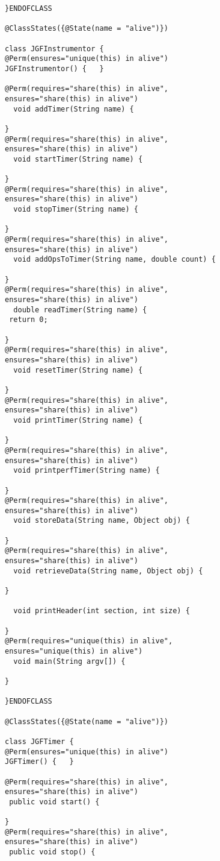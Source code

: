 \documentclass[10pt]{article}
\begin{document}
\begin{lstlisting}
}ENDOFCLASS

@ClassStates({@State(name = "alive")})

class JGFInstrumentor {
@Perm(ensures="unique(this) in alive")
JGFInstrumentor() {   }

@Perm(requires="share(this) in alive",
ensures="share(this) in alive")
  void addTimer(String name) {
 
} 
@Perm(requires="share(this) in alive",
ensures="share(this) in alive")
  void startTimer(String name) {
 
} 
@Perm(requires="share(this) in alive",
ensures="share(this) in alive")
  void stopTimer(String name) {
 
} 
@Perm(requires="share(this) in alive",
ensures="share(this) in alive")
  void addOpsToTimer(String name, double count) {
 
} 
@Perm(requires="share(this) in alive",
ensures="share(this) in alive")
  double readTimer(String name) {
 return 0;
 
} 
@Perm(requires="share(this) in alive",
ensures="share(this) in alive")
  void resetTimer(String name) {
 
} 
@Perm(requires="share(this) in alive",
ensures="share(this) in alive")
  void printTimer(String name) {
 
} 
@Perm(requires="share(this) in alive",
ensures="share(this) in alive")
  void printperfTimer(String name) {
 
} 
@Perm(requires="share(this) in alive",
ensures="share(this) in alive")
  void storeData(String name, Object obj) {
 
} 
@Perm(requires="share(this) in alive",
ensures="share(this) in alive")
  void retrieveData(String name, Object obj) {
 
} 

  void printHeader(int section, int size) {
 
} 
@Perm(requires="unique(this) in alive",
ensures="unique(this) in alive")
  void main(String argv[]) {
 
} 

}ENDOFCLASS

@ClassStates({@State(name = "alive")})

class JGFTimer {
@Perm(ensures="unique(this) in alive")
JGFTimer() {   }

@Perm(requires="share(this) in alive",
ensures="share(this) in alive")
 public void start() {
 
} 
@Perm(requires="share(this) in alive",
ensures="share(this) in alive")
 public void stop() {
 

\end{lstlisting}
\end{document}
